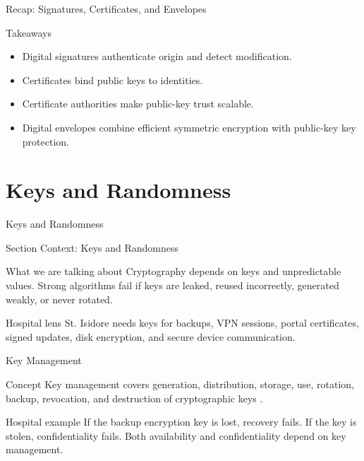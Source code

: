 \documentclass[presentation]{beamer}
\newcommand{\sectiontitleframe}[1]{
\begin{frame}[plain,c]
\begin{center}
{\usebeamerfont{title}\usebeamercolor[fg]{title}#1}
\end{center}
\end{frame}
}
\begin{document}
\begin{frame}[c]{Recap: Signatures, Certificates, and Envelopes}
\begin{block}{Takeaways}
\begin{itemize}
    \item Digital signatures authenticate origin and detect modification.
    \item Certificates bind public keys to identities.
    \item Certificate authorities make public-key trust scalable.
    \item Digital envelopes combine efficient symmetric encryption with public-key key protection.
\end{itemize}
\end{block}
\end{frame}

\section{Keys and Randomness}
\sectiontitleframe{Keys and Randomness}

\begin{frame}[c]{Section Context: Keys and Randomness}
\begin{block}{What we are talking about}
Cryptography depends on keys and unpredictable values. Strong algorithms fail if keys are leaked,
reused incorrectly, generated weakly, or never rotated.
\end{block}

\begin{exampleblock}{Hospital lens}
St. Isidore needs keys for backups, VPN sessions, portal certificates, signed updates, disk
encryption, and secure device communication.
\end{exampleblock}
\end{frame}

\begin{frame}[c]{Key Management}
\begin{block}{Concept}
Key management covers generation, distribution, storage, use, rotation, backup, revocation, and
destruction of cryptographic keys \cite{nist_sp_800_57}.
\end{block}

\begin{exampleblock}{Hospital example}
If the backup encryption key is lost, recovery fails. If the key is stolen, confidentiality fails.
Both availability and confidentiality depend on key management.
\end{exampleblock}
\end{frame}
\end{document}
